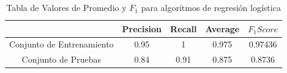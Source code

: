 \begin{table}[h]
\begin{center}
\begin{tabular}{c|cc|c|c|}
& Precision & Recall & Average & $F_1 Score$ \\
\hline
Conjunto de Entrenamiento & 0.95 & 1 & 0.975 &  0.97436 \\ 
Conjunto de Pruebas & 0.84 & 0.91 & 0.875 &  0.8736 \\ 
\end{tabular}

\label{tab:valores}
\caption{Tabla de Valores de Promedio y $F_1$ para algoritmos de regresi\'on log\'istica}
\end{center}
\end{table}


